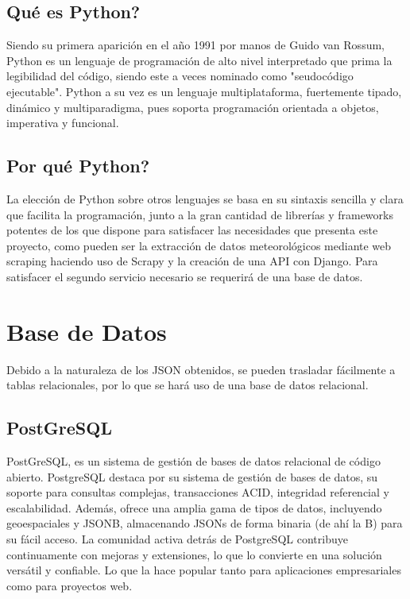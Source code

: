 \subsection{Qué es Python?}
Siendo su primera aparición en el año 1991 por manos de Guido van Rossum, Python es un lenguaje de programación de alto nivel interpretado que prima la legibilidad del código, siendo este a veces nominado como "seudocódigo ejecutable". \cite{dierbach2014python}
\newline
\newline
Python a su vez es un lenguaje multiplataforma, fuertemente tipado, dinámico y multiparadigma, pues soporta programación orientada a objetos, imperativa y funcional. \cite{PyDoc} \cite{borges2014python}

\subsection{Por qué Python?}
La elección de Python sobre otros lenguajes se basa en su sintaxis sencilla y clara que facilita la programación, junto a la gran cantidad de librerías y frameworks potentes de los que dispone para satisfacer las necesidades que presenta este proyecto, como pueden ser la extracción de datos meteorológicos mediante web scraping haciendo uso de Scrapy y la creación de una API con Django.\newline
\newline
Para satisfacer el segundo servicio necesario se requerirá de una base de datos.

\section{Base de Datos}
Debido a la naturaleza de los JSON obtenidos, se pueden trasladar fácilmente a tablas relacionales, por lo que se hará uso de una base de datos relacional.

\subsection{PostGreSQL}
PostGreSQL, es un sistema de gestión de bases de datos relacional de código abierto. PostgreSQL destaca por su sistema de gestión de bases de datos, su soporte para consultas complejas, transacciones ACID, integridad referencial y escalabilidad.\newline
\newline
Además, ofrece una amplia gama de tipos de datos, incluyendo geoespaciales y JSONB, almacenando JSONs de forma binaria (de ahí la B) para su fácil acceso.\newline
\newline
La comunidad activa detrás de PostgreSQL contribuye continuamente con mejoras y extensiones, lo que lo convierte en una solución versátil y confiable. Lo que la hace popular tanto para aplicaciones empresariales como para proyectos web.

